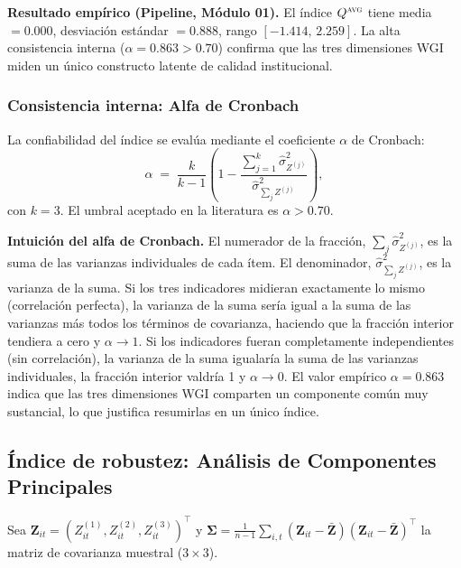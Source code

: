 \documentclass[12pt, a4paper]{article}
\theoremstyle{definition}
\begin{document}
\begin{resultbox}
\textbf{Resultado empírico (Pipeline, Módulo 01).} El índice $Q^{\textsc{avg}}$ tiene media $= 0.000$, desviación estándar $= 0.888$, rango $[-1.414,\, 2.259]$. La alta consistencia interna ($\alpha = 0.863 > 0.70$) confirma que las tres dimensiones WGI miden un único constructo latente de calidad institucional.
\end{resultbox}

\subsubsection{Consistencia interna: Alfa de Cronbach}

La confiabilidad del índice se evalúa mediante el coeficiente $\alpha$ de Cronbach:
\[
  \alpha \;=\; \frac{k}{k-1}\left(1 - \frac{\sum_{j=1}^{k} \hat{\sigma}^2_{Z^{(j)}}}{\hat{\sigma}^2_{\sum_j Z^{(j)}}}\right),
\]
con $k=3$. El umbral aceptado en la literatura es $\alpha > 0.70$.

\begin{intuitionbox}
\textbf{Intuición del alfa de Cronbach.} El numerador de la fracción, $\sum_j \hat{\sigma}^2_{Z^{(j)}}$, es la suma de las varianzas individuales de cada ítem. El denominador, $\hat{\sigma}^2_{\sum_j Z^{(j)}}$, es la varianza de la suma. Si los tres indicadores midieran exactamente lo mismo (correlación perfecta), la varianza de la suma sería igual a la suma de las varianzas más todos los términos de covarianza, haciendo que la fracción interior tendiera a cero y $\alpha \to 1$. Si los indicadores fueran completamente independientes (sin correlación), la varianza de la suma igualaría la suma de las varianzas individuales, la fracción interior valdría 1 y $\alpha \to 0$. El valor empírico $\alpha = 0.863$ indica que las tres dimensiones WGI comparten un componente común muy sustancial, lo que justifica resumirlas en un único índice.
\end{intuitionbox}

\subsection{Índice de robustez: Análisis de Componentes Principales}
\label{sec:inst_pca}

Sea $\bm{Z}_{it} = (Z^{(1)}_{it}, Z^{(2)}_{it}, Z^{(3)}_{it})^\top$ y $\bm{\Sigma} = \frac{1}{n-1}\sum_{i,t}(\bm{Z}_{it}-\bar{\bm{Z}})(\bm{Z}_{it}-\bar{\bm{Z}})^\top$ la matriz de covarianza muestral ($3\times 3$).
\end{document}
